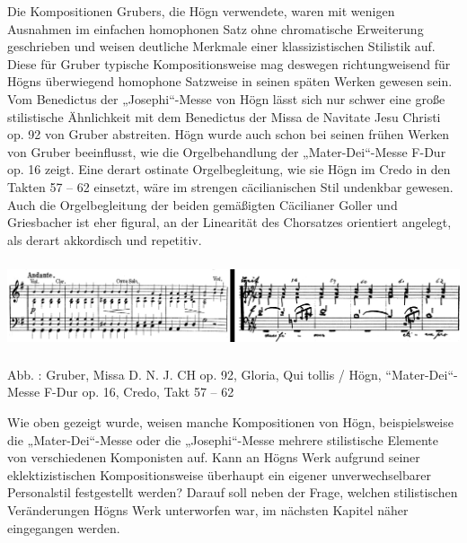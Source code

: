 Die Kompositionen Grubers, die Högn verwendete, waren mit wenigen
Ausnahmen im einfachen homophonen Satz ohne chromatische Erweiterung
geschrieben und weisen deutliche Merkmale einer klassizistischen
Stilistik auf. Diese für Gruber typische Kompositionsweise mag deswegen
richtungweisend für Högns überwiegend homophone Satzweise in seinen
späten Werken gewesen sein. Vom Benedictus der „Josephi“-Messe von Högn
lässt sich nur schwer eine große stilistische Ähnlichkeit mit dem
Benedictus der Missa de Navitate Jesu Christi op. 92 von Gruber
abstreiten. Högn wurde auch schon bei seinen frühen Werken von Gruber
beeinflusst, wie die Orgelbehandlung der „Mater-Dei“-Messe F-Dur op. 16
zeigt. Eine derart ostinate Orgelbegleitung, wie sie Högn im Credo in
den Takten 57 – 62 einsetzt, wäre im strengen cäcilianischen Stil
undenkbar gewesen. Auch die Orgelbegleitung der beiden gemäßigten
Cäcilianer Goller und Griesbacher ist eher figural, an der Linearität
des Chorsatzes orientiert angelegt, als derart akkordisch und
repetitiv.


\includegraphics[width=15.977cm,height=2.589cm]{pictures/zulassungsarbeit-img094.png}


Abb. : Gruber, Missa D. N. J. CH op. 92,
Gloria, Qui tollis / Högn, “Mater-Dei“-Messe F-Dur op. 16, Credo, Takt
57 – 62

Wie oben gezeigt wurde, weisen manche Kompositionen von Högn,
beispielsweise die „Mater-Dei“-Messe oder die „Josephi“-Messe mehrere
stilistische Elemente von verschiedenen Komponisten auf. Kann an Högns
Werk aufgrund seiner eklektizistischen Kompositionsweise überhaupt ein
eigener unverwechselbarer Personalstil festgestellt werden? Darauf soll
neben der Frage, welchen stilistischen Veränderungen Högns Werk
unterworfen war, im nächsten Kapitel näher eingegangen werden.